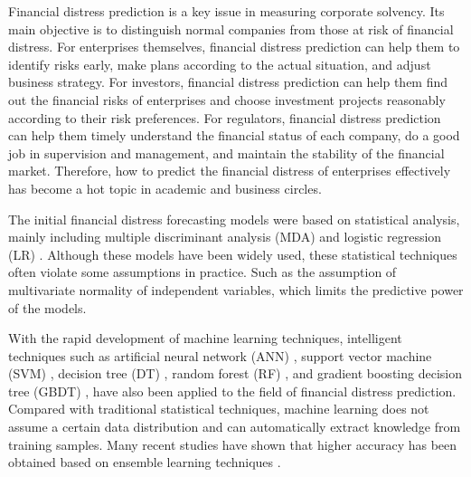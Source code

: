 \documentclass[review]{elsarticle}
\begin{document}
Financial distress prediction is a key issue in measuring corporate solvency. Its main objective is to distinguish normal companies from those at risk of financial distress. For enterprises themselves, financial distress prediction can help them to identify risks early, make plans according to the actual situation, and adjust business strategy. For investors, financial distress prediction can help them find out the financial risks of enterprises and choose investment projects reasonably according to their risk preferences. For regulators, financial distress prediction can help them timely understand the financial status of each company, do a good job in supervision and management, and maintain the stability of the financial market. Therefore, how to predict the financial distress of enterprises effectively has become a hot topic in academic and business circles\citep{Alaka2015, Altman2017, Qu2019}.

The initial financial distress forecasting models were based on statistical analysis, mainly including multiple discriminant analysis (MDA) \citep{Altman1968, Altman1977, casey1984corporate} and logistic regression (LR) \citep{Altman2007, Ohlson1980, Pantalone1987}. Although these models have been widely used, these statistical techniques often violate some assumptions in practice. Such as the assumption of multivariate normality of independent variables, which limits the predictive power of the models\citep{Begley1996}.

With the rapid development of machine learning techniques, intelligent techniques such as artificial neural network (ANN) \citep{Adisa2019, Atiya2001, West2000}, support vector machine (SVM) \citep{Ding2008, Fallahpour2017}, decision tree (DT) \citep{Khemakhem2018, Sun2008}, random forest (RF) \citep{Barboza2017, Teles2020}, and gradient boosting decision tree (GBDT) \citep{Son2019, Wyrobek2019, Xia2017}, have also been applied to the field of financial distress prediction. Compared with traditional statistical techniques, machine learning does not assume a certain data distribution and can automatically extract knowledge from training samples. Many recent studies have shown that higher accuracy has been obtained based on ensemble learning techniques \citep{Alaka2018, Nanni2009, RaviKumar2007}.
\end{document}
